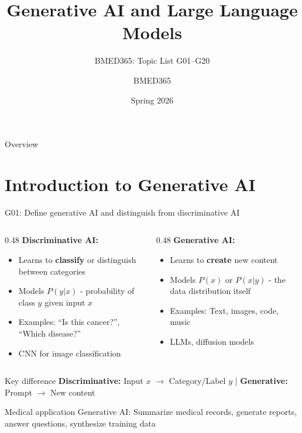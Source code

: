 \documentclass[aspectratio=169, 10pt]{beamer}
\title{Generative AI and Large Language Models}
\subtitle{BMED365: Topic List G01--G20}
\author{BMED365}
\date{Spring 2026}
\begin{document}
\begin{frame}
    \titlepage
\end{frame}

\begin{frame}{Overview}
    \tableofcontents
\end{frame}

\section{Introduction to Generative AI}

\begin{frame}{G01: Define generative AI and distinguish from discriminative AI}
    \begin{columns}[T]
        \begin{column}{0.48\textwidth}
            \textbf{Discriminative AI:}
            \begin{itemize}
                \item Learns to \textbf{classify} or distinguish between categories
                \item Models $P(y|x)$ - probability of class $y$ given input $x$
                \item Examples: ``Is this cancer?'', ``Which disease?''
                \item CNN for image classification
            \end{itemize}
        \end{column}
        \begin{column}{0.48\textwidth}
            \textbf{Generative AI:}
            \begin{itemize}
                \item Learns to \textbf{create} new content
                \item Models $P(x)$ or $P(x|y)$ - the data distribution itself
                \item Examples: Text, images, code, music
                \item LLMs, diffusion models
            \end{itemize}
        \end{column}
    \end{columns}

    \vspace{0.2cm}
    \begin{block}{\footnotesize Key difference}
        \footnotesize
        \textbf{Discriminative:} Input $x$ $\rightarrow$ Category/Label $y$ \quad | \quad
        \textbf{Generative:} Prompt $\rightarrow$ New content
    \end{block}

    \begin{alertblock}{\footnotesize Medical application}
        \footnotesize Generative AI: Summarize medical records, generate reports, answer questions, synthesize training data
    \end{alertblock}
\end{frame}
\end{document}
